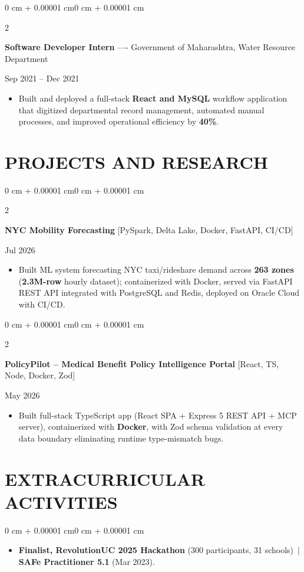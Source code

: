 \documentclass[10pt, letterpaper]{article}
\newenvironment{highlights}{
    \begin{itemize}[
        topsep=0.10 cm,
        parsep=0.06 cm,
        partopsep=0pt,
        itemsep=0.06 cm,
        leftmargin=12pt
    ]
}{
    \end{itemize}
}
\newenvironment{onecolentry}{
    \begin{adjustwidth}{0 cm + 0.00001 cm}{0 cm + 0.00001 cm}
}{
    \end{adjustwidth}
}
\newenvironment{twocolentry}[2][]{
    \onecolentry
    \def\secondColumn{#2}
    \setcolumnwidth{\fill, 4.5 cm}
    \begin{paracol}{2}
}{
    \switchcolumn \raggedleft \secondColumn
    \end{paracol}
    \endonecolentry
}
\begin{document}
\vspace{0.15 cm}

\begin{twocolentry}{Sep 2021 -- Dec 2021}
\textbf{Software Developer Intern} ---- Government of Maharashtra, Water Resource Department
\end{twocolentry}
\begin{highlights}
  \item Built and deployed a full-stack \textbf{React and MySQL} workflow application that digitized departmental record management, automated manual processes, and improved operational efficiency by \textbf{40\%}.
\end{highlights}

\section{PROJECTS AND RESEARCH}
\begin{twocolentry}{Jul 2026}
\textbf{NYC Mobility Forecasting} [PySpark, Delta Lake, Docker, FastAPI, CI/CD]
\end{twocolentry}
\begin{highlights}
  \item Built ML system forecasting NYC taxi/rideshare demand across \textbf{263 zones} (\textbf{2.3M-row} hourly dataset); containerized with Docker, served via FastAPI REST API integrated with PostgreSQL and Redis, deployed on Oracle Cloud with CI/CD.
\end{highlights}

\vspace{0.12 cm}

\begin{twocolentry}{May 2026}
\textbf{PolicyPilot -- Medical Benefit Policy Intelligence Portal} [React, TS, Node, Docker, Zod]
\end{twocolentry}
\begin{highlights}
  \item Built full-stack TypeScript app (React SPA + Express 5 REST API + MCP server), containerized with \textbf{Docker}, with Zod schema validation at every data boundary eliminating runtime type-mismatch bugs.
\end{highlights}

\section{EXTRACURRICULAR ACTIVITIES}
\begin{onecolentry}
\begin{highlights}
  \item \textbf{Finalist, RevolutionUC 2025 Hackathon} (300 participants, 31 schools) \,|\, \textbf{SAFe Practitioner 5.1} (Mar 2023).
\end{highlights}
\end{onecolentry}
\end{document}
